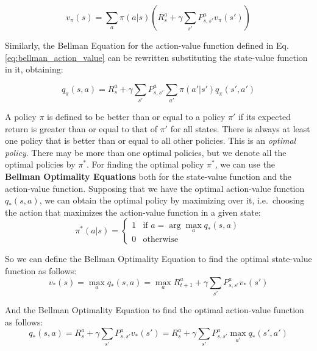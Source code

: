 \begin{equation}
    v_{\pi}(s) = \sum_{a} \pi(a|s)(R_s^a + \gamma \sum_{s'} P_{s, s'}^a v_{\pi}(s'))
\end{equation}

Similarly, the Bellman Equation for the action-value function defined in Eq. \ref{eq:bellman_action_value} can be rewritten substituting the state-value function in it, obtaining:

\begin{equation}
    q_{\pi}(s, a) = R_s^a + \gamma \sum_{s'} P_{s, s'}^a \sum_{a'} \pi(a'|s')q_{\pi}(s', a')
\end{equation}



A policy $\pi$ is defined to be better than or equal to a policy $\pi'$ if its expected return is greater than or equal to that of $\pi'$ for all states.
There is always at least one policy that is better than or equal to all other policies.
This is an \textit{optimal policy}.
There may be more than one optimal policies, but we denote all the optimal policies by $\pi^*$.
For finding the optimal policy $\pi^*$, we can use the \textbf{Bellman Optimality Equations} both for the state-value function and the action-value function.
Supposing that we have the optimal action-value function $q_*(s, a)$, we can obtain the optimal policy by maximizing over it, i.e.\ choosing the action that maximizes the action-value function in a given state:
\begin{equation}
    \label{eq:optimal_policy}
    \pi^*(a|s) = \begin{cases}
        1 & \text{if } a = \arg\max_{a} q_*(s, a) \\
        0 & \text{otherwise}
    \end{cases}
\end{equation}


So we can define the Bellman Optimality Equation to find the optimal state-value function as follows:
\begin{equation} \label{eq:optimal_state_value}
    v_*(s) = \max_{a} q_*(s, a) = \max_{a} R_{t+1}^a + \gamma \sum_{s'} P_{s, s'}^a v_*(s')
\end{equation}

And the Bellman Optimality Equation to find the optimal action-value function as follows:
\begin{equation} \label{eq:optimal_action_value}
    q_*(s, a) = R_s^a + \gamma \sum_{s'} P_{s, s'}^a v_*(s') = R_s^a + \gamma \sum_{s'} P_{s, s'}^a \max_{a'} q_*(s', a')
\end{equation}


